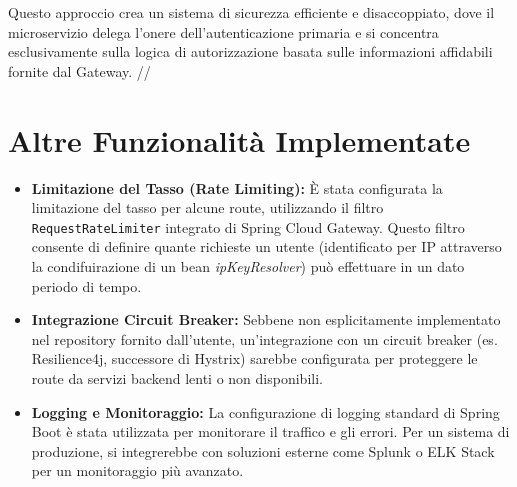 Questo approccio crea un sistema di sicurezza efficiente e disaccoppiato, dove il microservizio delega l'onere dell'autenticazione primaria e si concentra esclusivamente sulla logica di autorizzazione basata sulle informazioni affidabili fornite dal Gateway. // 

\section{Altre Funzionalità Implementate}
\begin{itemize}
    \item \textbf{Limitazione del Tasso (Rate Limiting):} È stata configurata la limitazione del tasso per alcune route, utilizzando il filtro \texttt{RequestRateLimiter} integrato di Spring Cloud Gateway. Questo filtro consente di definire quante richieste un utente (identificato per IP attraverso la condifuirazione di un bean \textit{ipKeyResolver}) può effettuare in un dato periodo di tempo.
    
    \item \textbf{Integrazione Circuit Breaker:} Sebbene non esplicitamente implementato nel repository fornito dall'utente, un'integrazione con un circuit breaker (es. Resilience4j, successore di Hystrix) sarebbe configurata per proteggere le route da servizi backend lenti o non disponibili.
    \item \textbf{Logging e Monitoraggio:} La configurazione di logging standard di Spring Boot è stata utilizzata per monitorare il traffico e gli errori. Per un sistema di produzione, si integrerebbe con soluzioni esterne come Splunk o ELK Stack per un monitoraggio più avanzato.
\end{itemize}

